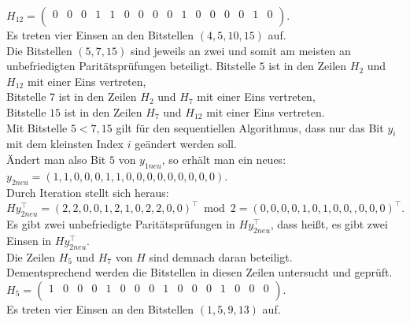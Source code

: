 \begin{Beispiel}
    $H_{12}= \left( \begin{array}{rrrrrrrrrrrrrrrr}
        0 & 0 & 0 & 1 & 1 & 0 & 0 & 0 & 0 & 1 & 0 & 0 & 0 & 0 & 1 & 0 \\
       \end{array}\right). 
    $\\
    Es treten vier Einsen an den Bitstellen $(4, 5, 10, 15)$ auf.\\
    
    Die Bitstellen $(5, 7, 15)$ sind jeweils an zwei und somit am meisten an unbefriedigten Paritätsprüfungen beteiligt.
    Bitstelle $5$ ist in den Zeilen $H_2$ und $H_{12}$ mit einer Eins vertreten,\\
    Bitstelle $7$ ist in den Zeilen $H_2$ und $H_7$ mit einer Eins vertreten,\\
    Bitstelle $15$ ist in den Zeilen $H_7$ und $H_{12}$ mit einer Eins vertreten.\\
    Mit Bitstelle $5 < 7, 15$ gilt für den sequentiellen Algorithmus, dass nur das Bit $y_i$ mit dem kleinsten Index $i$ geändert werden soll.\\
    
    Ändert man also Bit $5$ von $y_{1neu}$, so erhält man ein neues:\\
    $y_{2neu} = (1,1,0,0,0,1,1,0,0,0,0,0,0,0,0,0).$\\
    
    Durch Iteration stellt sich heraus:\\
    $Hy_{2neu}^\intercal= (2,2,0,0,1,2,1,0,2,2,0,0)^\intercal \bmod 2= (0,0,0,0,1,0,1,0,0,,0,0,0)^\intercal.$\\
    
    Es gibt zwei unbefriedigte Paritätsprüfungen in $Hy_{2neu}^\intercal$, 
    dass hei\ss{}t, es gibt zwei Einsen in $Hy_{2neu}^\intercal.$\\
    Die Zeilen $H_5$ und $H_7$ von $H$ sind demnach daran beteiligt.\\ 
    Dementsprechend werden die Bitstellen in diesen Zeilen untersucht und geprüft.\\
    
    $H_5= \left( \begin{array}{rrrrrrrrrrrrrrrr}
        1 & 0 & 0 & 0 & 1 & 0 & 0 & 0 & 1 & 0 & 0 & 0 & 1 & 0 & 0 & 0 \\
       \end{array}\right). 
    $\\
    Es treten vier Einsen an den Bitstellen $(1, 5, 9, 13)$ auf.\\
    

\end{Beispiel}
